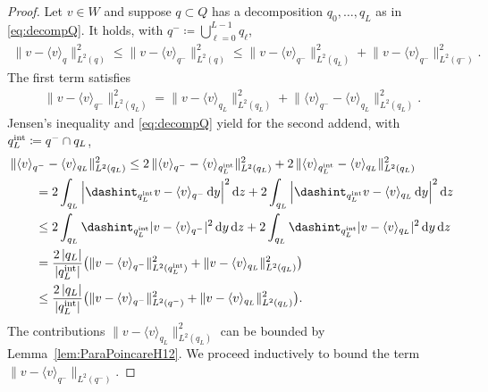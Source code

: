 \documentclass{amsart}
\providecommand{\dz}{\,\mathrm{d}z}
\providecommand{\dy}{\,\mathrm{d}y}
\begin{document}
\begin{proof}
Let $v\in W$ and suppose $q \subset Q$ has a decomposition $q_0,\dots,q_L$ as in \eqref{eq:decompQ}. It holds, with $q^- \coloneqq  \bigcup_{\ell=0}^{L-1} q_\ell$, 
\begin{align*}
\lVert v - \langle v \rangle_q \rVert_{L^2(q)}^2 \leq  \lVert v - \langle v \rangle_{q^-} \rVert_{L^2(q)}^2 \leq \lVert v - \langle v \rangle_{q^-} \rVert_{L^2(q_L)}^2 + \lVert v - \langle v \rangle_{q^-} \rVert_{L^2(q^-)}^2.
\end{align*}
The first term satisfies 
\begin{align*}
\lVert v - \langle v \rangle_{q^-} \rVert_{L^2(q_L)}^2 = \lVert v - \langle v \rangle_{q_L} \rVert_{L^2(q_L)}^2 + \lVert \langle v \rangle_{q^-} - \langle v \rangle_{q_L} \rVert_{L^2(q_L)}^2.
\end{align*}
Jensen's inequality and \eqref{eq:decompQ} yield for the second addend, with $q^\textup{int}_L \coloneqq q^-\cap q_L$,
\begin{align*}
&\lVert \langle v \rangle_{q^-} - \langle v \rangle_{q_L} \rVert_{L^2(q_L)}^2 \leq 2 \, \lVert \langle v \rangle_{q^-} - \langle v \rangle_{q^\textup{int}_L} \rVert_{L^2(q_L)}^2+2\, \lVert \langle v \rangle_{q^\textup{int}_L} - \langle v \rangle_{q_L} \rVert_{L^2(q_L)}^2 \\
& \qquad = 2 \int_{q_L} \Big| \dashint_{q_L^\textup{int}} v  - \langle v \rangle_{q^-}\dy \Big|^2 \dz + 2 \int_{q_L} \Big| \dashint_{q_L^\textup{int}} v  - \langle v \rangle_{q_L}\dy \Big|^2 \dz \\
&\qquad \leq 2 \int_{q_L} \dashint_{q^\textup{int}_L} |v -\langle v \rangle_{q^-}|^2 \dy\dz + 2 \int_{q_L} \dashint_{q^\textup{int}_L} |v -\langle v \rangle_{q_L}|^2 \dy\dz\\
&\qquad = \frac{2\, |q_L|}{|q_L^\textup{int}|} \big( \lVert v -\langle v \rangle_{q^-} \rVert_{L^2(q^\textup{int}_L)}^2 + \lVert v -\langle v \rangle_{q_L} \rVert_{L^2(q_L)}^2\big)\\
&\qquad\leq \frac{2\, |q_L|}{|q_L^\textup{int}|} \big( \lVert v -\langle v \rangle_{q^-} \rVert_{L^2(q^-)}^2 + \lVert v -\langle v \rangle_{q_L} \rVert_{L^2(q_L)}^2\big).
\end{align*}
The contributions $\lVert v -\langle v \rangle_{q_L} \rVert_{L^2(q_L)}^2$ can be bounded by Lemma~\ref{lem:ParaPoincareH12}. We proceed inductively to bound the term $\lVert v -\langle v \rangle_{q^-} \rVert_{L^2(q^-)}$.
\end{proof}
\end{document}
